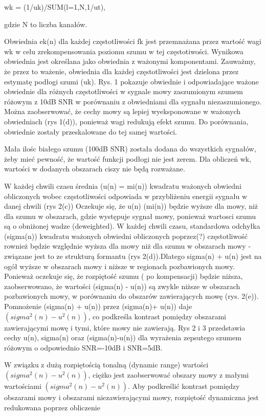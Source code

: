 \documentclass[eng,printmode]{mgr}
\begin{document}
 wk = (1/uk)/SUM(l=1,N,1/ut),
 
 gdzie N to liczba kanałów.
 
 Obwiednia ek(n) dla każdej częstotliwości fk jest przemnażana przez wartość wagi wk w celu zrekompensowania poziomu szumu w tej częstotiwości. Wynikowa obwiednia jest określana jako obwiednia z ważonymi komponentami. Zauważmy, że przez to ważenie, obwiednia dla każdej częstotliwości jest dzielona przez estymatę podłogi szumi (uk). Rys. 1 pokazuje obwiednie i odpowiadające ważone obwiednie dla różnych częstotliwości w sygnale mowy  zaszumionym szumem różowym z 10dB SNR w porównaniu z obwiedniami dla sygnału niezaszumionego. Można zaobserwować, że cechy mowy są lepiej wyeksponowane w ważonych obwiedniach (rys 1(d)), ponieważ wagi redukują efekt szumu. Do porównania, obwiednie zostały przeskalowane do tej samej wartości. 

 Mała ilośc białego szumu (100dB SNR) została dodana do wszystkich sygnałów, żeby mieć pewność, że wartość funkcji podłogi nie jest zerem. Dla obliczeń wk, wartości w dodanych obszarach ciszy nie będą rozważane. 
 
 W każdej chwili czasu średnia (u(n) = mi(n)) kwadratu ważonych obwiedni obliczonych  wobec częstotliwości odpowiada w przybliżeniu energii sygnału w danej chwili (rys 2(c)) Oczekuje się, że u(n) (mi(n)) będzie wyższe dla mowy, niż dla szumu w obszarach, gdzie występuje sygnał mowy, ponieważ wartosci szumu są o obniżonej wadze (deweighted). W każdej chwili czasu, standardowa odchyłka (sigma(n)) kwadratu ważonych obwiedni obliczonych poprzez(?) częstotliwość rownież będzie względnie wyższa dla mowy niż dla szumu w obszarach mowy - związane jest to ze strukturą formantu (rys 2(d)).Dlatego sigma(n) + u(n) jest na ogół wyższe w obszarach mowy i niższe w regionach pozbawionych mowy. Ponieważ oczekuje się, że rozpiętość szumu ( po kompensacji) będzie niższa, zaobserwowano, że wartości (sigma(n) - u(n)) są zwykle niższe w obszarach pozbawionych mowy, w porównaniu do obszarów zawierających mowę (rys. 2(e)). Pomnożenie (sigma(n) + u(n)) przez (sigma(n)+ u(n)) daje $(sigma^2(n) - u^2(n))$, co podkreśla kontrast pomiędzy obszarami zawierającymi mowę i tymi, które mowy nie zawierają. Rys 2 i 3 przedstawia cechy u(n), sigma(n) oraz (sigma(n)-u(n)) dla wyrażenia zepsutego szumem różowym o odpowiednio SNR=-10dB i SNR=5dB.   
 
 W związku z dużą rozpiętością tonalną (dynamic range) wartości $(sigma^2(n) - u^2(n))$, ciężko jest zaobserwować obszary mowy z małymi wartościami  $(sigma^2(n) - u^2(n))$. Aby podkreślić kontrast pomiędzy obszarami mowy i obszarami niezawierającymi mowy, rozpiętość dynamiczna jest redukowana poprzez obliczenie
 
\end{document}
